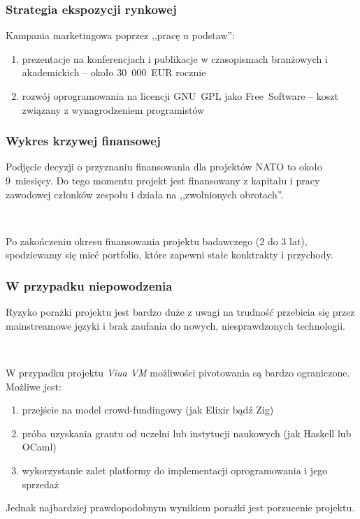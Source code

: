 \documentclass{beamer}
\begin{document}
\begin{frame}
    \frametitle{Strategia ekspozycji rynkowej}

    Kampania marketingowa poprzez ,,pracę u podstaw'':

    \begin{enumerate}
        \item prezentacje na konferencjach i publikacje w czasopismach
            branżowych i akademickich -- około 30~000~EUR rocznie
        \item rozwój oprogramowania na licencji GNU~GPL jako Free~Software --
            koszt związany z wynagrodzeniem programistów
    \end{enumerate}
\end{frame}

\begin{frame}
    \frametitle{Wykres krzywej finansowej}

    Podjęcie decyzji o przyznaniu finansowania dla projektów NATO to około
    9~miesięcy. Do tego momentu projekt jest finansowany z kapitału i pracy
    zawodowej członków zespołu i działa na ,,zwolnionych obrotach''.

    ~

    Po zakończeniu okresu finansowania projektu badawczego (2 do 3 lat),
    spodziewamy się mieć portfolio, które zapewni stałe konktrakty i przychody.
\end{frame}

\begin{frame}
    \frametitle{W przypadku niepowodzenia}

    Ryzyko porażki projektu jest bardzo duże z uwagi na trudność przebicia się
    przez mainstreamowe języki i brak zaufania do nowych, niesprawdzonych
    technologii.

    ~

    W przypadku projektu \emph{Viua VM} możliwości pivotowania są bardzo
    ograniczone. Możliwe jest:

    \begin{enumerate}
        \item przejście na model crowd-fundingowy (jak Elixir bądź Zig)
        \item próba uzyskania grantu od uczelni lub instytucji naukowych (jak
            Haskell lub OCaml)
        \item wykorzystanie zalet platformy do implementacji oprogramowania i
            jego sprzedaż
    \end{enumerate}
    Jednak najbardziej prawdopodobnym wynikiem porażki jest porzucenie projektu.
\end{frame}
\end{document}
